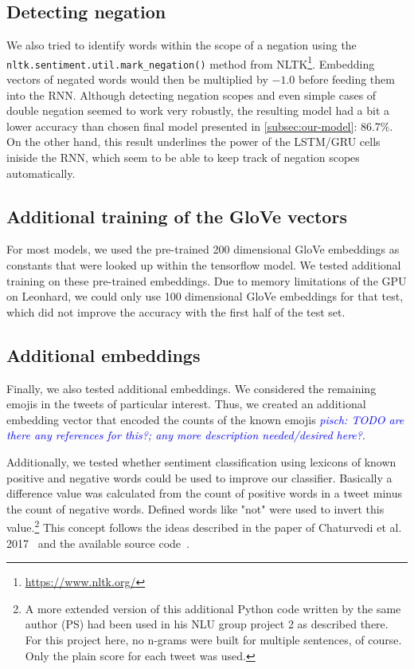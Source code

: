 \documentclass[10pt,conference,compsocconf]{IEEEtran}
\newcommand{\pisch}[1]{\textit{\textcolor{blue}{pisch: #1}}}
\begin{document}
\subsection*{Detecting negation}

We also tried to identify words within the scope of a negation using
the \texttt{nltk.sentiment.util.mark\_negation()} method from
NLTK\footnote{\url{https://www.nltk.org/}}.
Embedding vectors of negated words would then be multiplied by $-1.0$ before
feeding them into the RNN. Although detecting negation scopes and even
simple cases of double negation seemed to work very robustly, the
resulting model had a bit a lower accuracy than chosen final model presented in
\autoref{subsec:our-model}: 86.7\%. On the other hand, this result underlines
the power of the LSTM/GRU cells iniside the RNN, which seem to be able
to keep track of negation scopes automatically.


\subsection*{Additional training of the GloVe vectors}

For most models, we used the pre-trained 200 dimensional GloVe embeddings as
constants that were looked up within the tensorflow model. We tested additional
training on these pre-trained embeddings. Due to memory limitations of the GPU on
Leonhard, we could only use 100 dimensional GloVe embeddings for that test, which
did not improve the accuracy with the first half of the test set.


\subsection*{Additional embeddings}

Finally, we also tested additional embeddings.
We considered the remaining emojis in the tweets of particular interest.
Thus, we created an additional embedding vector that encoded the counts of the
known emojis \pisch{TODO are there any references for this?; any more description needed/desired here?}.

Additionally, we tested whether sentiment classification using lexicons of known 
positive and negative words could be used to improve our classifier.
Basically a difference value was calculated from the count of positive words in a 
tweet minus the count of negative words. Defined words like "not" were used to 
invert this value.\footnote{A more extended version of this additional Python code 
written by the same author (PS) had been used in his NLU group project 2 as 
described there. For this project here, no n-grams were built for multiple 
sentences, of course. Only the plain score for each tweet was used.} This concept 
follows the ideas described in the paper of Chaturvedi et al. 
2017~\cite{chaturvedi2017} and the available source code~\cite{chaturvedi_code}.
\end{document}
